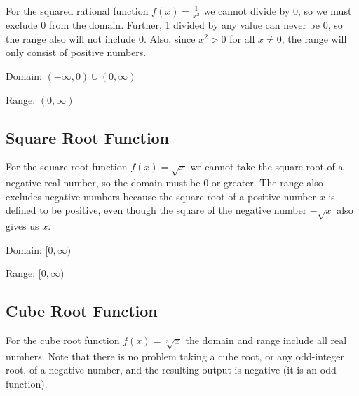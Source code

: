


For the squared rational function $f(x) = \frac{1}{x^2}$ we cannot divide by 0, so we must
exclude 0 from the domain. Further, 1 divided by any value can never be 0, so the range
also will not include 0. Also, since $x^2 > 0$ for all $x\neq 0$, the range will only
consist of positive numbers.



Domain: $( -\infty , 0) \cup (0, \infty )$



Range: $(0, \infty )$




\subsection{Square Root Function}
\label{sss:squa-a510}







For the square root function $f(x) = \sqrt{x}$ we cannot take the square root of a
negative real number, so the domain must be 0 or greater. The range also excludes negative
numbers because the square root of a positive number $x$ is defined to be positive, even
though the square of the negative number $-\sqrt{x}$ also gives us $x$.



Domain: $[0, \infty )$



Range: $[0, \infty )$




\subsection{Cube Root Function}
\label{sss:cube-28dd}







For the cube root function $f(x) = \sqrt[3]{x}$ the domain and range include all real
numbers. Note that there is no problem taking a cube root, or any odd-integer root, of a
negative number, and the resulting output is negative (it is an odd function).



